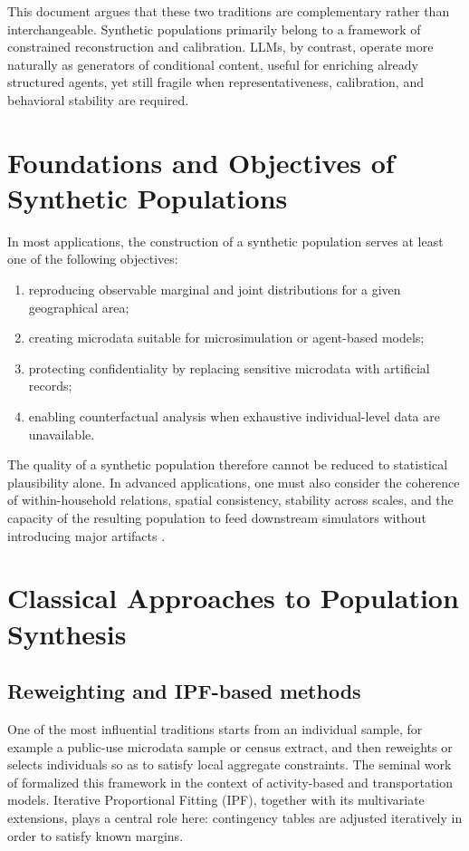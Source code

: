 \documentclass[11pt,a4paper]{article}
\begin{document}
This document argues that these two traditions are complementary rather than interchangeable. Synthetic populations primarily belong to a framework of constrained reconstruction and calibration. LLMs, by contrast, operate more naturally as generators of conditional content, useful for enriching already structured agents, yet still fragile when representativeness, calibration, and behavioral stability are required.

\section{Foundations and Objectives of Synthetic Populations}
In most applications, the construction of a synthetic population serves at least one of the following objectives:
\begin{enumerate}
  \item reproducing observable marginal and joint distributions for a given geographical area;
  \item creating microdata suitable for microsimulation or agent-based models;
  \item protecting confidentiality by replacing sensitive microdata with artificial records;
  \item enabling counterfactual analysis when exhaustive individual-level data are unavailable.
\end{enumerate}

The quality of a synthetic population therefore cannot be reduced to statistical plausibility alone. In advanced applications, one must also consider the coherence of within-household relations, spatial consistency, stability across scales, and the capacity of the resulting population to feed downstream simulators without introducing major artifacts \citep{farooq2013,chapuis2022}.

\section{Classical Approaches to Population Synthesis}
\subsection{Reweighting and IPF-based methods}
One of the most influential traditions starts from an individual sample, for example a public-use microdata sample or census extract, and then reweights or selects individuals so as to satisfy local aggregate constraints. The seminal work of \citet{beckman1996} formalized this framework in the context of activity-based and transportation models. Iterative Proportional Fitting (IPF), together with its multivariate extensions, plays a central role here: contingency tables are adjusted iteratively in order to satisfy known margins.
\end{document}
